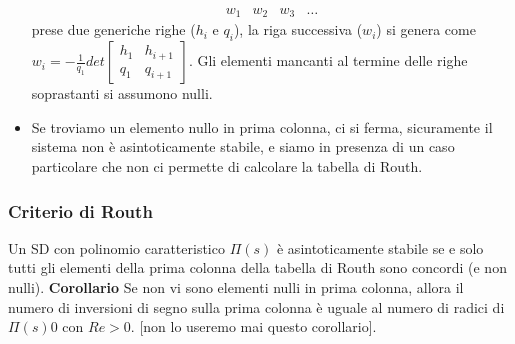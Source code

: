 \begin{itemize}
\[\begin{matrix}
            w_1 & w_2 & w_3 & \dots
        \end{matrix}
    \]
    prese due generiche righe ($h_i$ e $q_i$), la riga successiva ($w_i$) si genera come $w_i = - \frac{1}{q_1} det\left[\begin{matrix}
        h_1 & h_{i+1} \\
        q_1 & q_{i+1}
    \end{matrix}\right]$.\newline
    Gli elementi mancanti al termine delle righe soprastanti si assumono nulli.
    \item Se troviamo un elemento nullo in prima colonna, ci si ferma, sicuramente il sistema non è asintoticamente stabile, e siamo in presenza di un caso particolare che non ci permette di calcolare la tabella di Routh.
\end{itemize}
\subsubsection{Criterio di Routh}
Un SD con polinomio caratteristico $\Pi(s)$ è asintoticamente stabile se e solo tutti gli elementi della prima colonna della tabella di Routh sono concordi (e non nulli).\newline
\newline
\textbf{Corollario}\newline
Se non vi sono elementi nulli in prima colonna, allora il numero di inversioni di segno sulla prima colonna è uguale al numero di radici di $\Pi(s)0$ con $Re>0$. [non lo useremo mai questo corollario].
